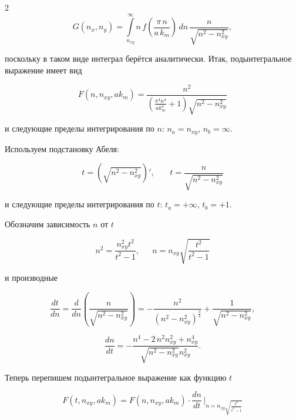 \documentclass[twoside, 10pt]{article}
\begin{document}
\begin{multicols}{2}
\begin{equation}
G\left(n_x, n_y\right) = \int\limits_{n_{xy}}^{\infty}n\,
f\left(\frac{\pi\,n}{a\,k_m}\right)\,dn\,{\frac{n}{\sqrt{n^{2} - n_{xy}^{2}}}},
\end{equation}

    поскольку в таком виде интеграл берётся аналитически. Итак, подынтегральное выражение имеет вид

\begin{equation} \label{eq:A5}
F\left(n, n_{xy}, ak_m\right) = \frac{n^{2}}{{\left(\frac{\pi^{4} n^{4}}{\mathit{ak}_{m}^{4}} + 1\right)} \sqrt{n^{2} - n_{\mathit{xy}}^{2}}}
\end{equation}

    и следующие пределы интегрирования по \(n\): \(n_a = n_{xy}\),
\(n_b = \infty\).

    Используем подстановку Абеля:

\begin{equation}
t = \left(\sqrt{n^2-n_{xy}^2}\right)', \,\,\,\,\,\,\,\,\,\,\, t = \frac{n}{\sqrt{n^{2} - n_{\mathit{xy}}^{2}}}
\end{equation}

    и следующие пределы интегрирования по \(t\): \(t_a = +\infty\),
\(t_b = +1\).

    Обозначим зависимость \(n\) от \(t\)

\begin{equation}
n^{2} = \frac{n_{\mathit{xy}}^{2} t^{2}}{t^{2} - 1}, \,\,\,\,\,\,\,\,\, n = n_{\mathit{xy}} \sqrt{\frac{t^{2}}{t^{2} - 1}}
\end{equation}

    и производные

    \[\frac{dt}{dn} = \frac{d}{dn} \left( \frac{n}{\sqrt{n^{2} - n_{\mathit{xy}}^{2}}} \right)= -\frac{n^{2}}{{\left(n^{2} - n_{\mathit{xy}}^{2}\right)}^{\frac{3}{2}}} + \frac{1}{\sqrt{n^{2} - n_{\mathit{xy}}^{2}}},\]

\begin{equation}
\frac{dn}{dt} = -\frac{n^{4} - 2 \, n^{2} n_{\mathit{xy}}^{2} + n_{\mathit{xy}}^{4}}{\sqrt{n^{2} - n_{\mathit{xy}}^{2}} n_{\mathit{xy}}^{2}}.
\end{equation}

    Теперь перепишем подынтегральное выражение как функцию \(t\)

    \[F\left(t, n_{xy}, ak_m\right) = F\left(n, n_{xy}, ak_m\right) \cdot \frac{dn}{dt} \, \Bigg\rvert_{ n = n_{\mathit{xy}} \sqrt{\frac{t^{2}}{t^{2} - 1}} }\]


\end{multicols}
\end{document}
